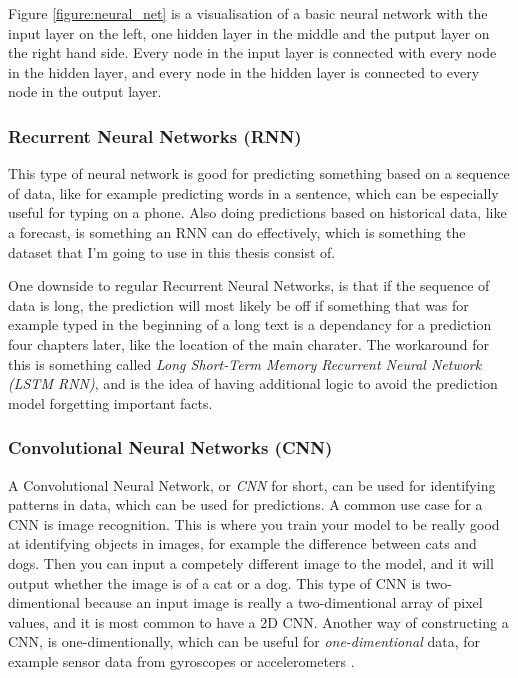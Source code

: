 Figure \ref{figure:neural_net} is a visualisation of a basic neural network with the input layer on the left,
one hidden layer in the middle and the putput layer on the right hand side. Every node in the input layer is connected with every node in the hidden layer,
and every node in the hidden layer is connected to every node in the output layer.

\subsubsection{Recurrent Neural Networks (RNN)}
This type of neural network is good for predicting something based on a sequence of data, like for example predicting words in a sentence, which 
can be especially useful for typing on a phone. Also doing predictions based on historical data, like a forecast, is something an RNN can do effectively, 
which is something the dataset that I'm going to use in this thesis consist of. 

One downside to regular Recurrent Neural Networks, is that if the sequence of data is long, the prediction will most likely be off if something that was for example 
typed in the beginning of a long text is a dependancy for a prediction four chapters later, like the location of the main charater. The workaround for this
is something called \textit{Long Short-Term Memory Recurrent Neural Network (LSTM RNN)}, and is the idea of having additional logic to avoid 
the prediction model forgetting important facts.

\subsubsection{Convolutional Neural Networks (CNN)}
A Convolutional Neural Network, or \textit{CNN} for short, can be used for identifying patterns in data, which can be used for predictions.
A common use case for a CNN is image recognition. This is where you train your model to be really good at identifying objects in images, 
for example the difference between cats and dogs. Then you can input a competely different image to the model, and it will output whether the image is of 
a cat or a dog. This type of CNN is two-dimentional because an input image is really a two-dimentional array of pixel values, and it is most common to have a 
2D CNN. Another way of constructing a CNN, is one-dimentionally, which can be useful for \textit{one-dimentional} data, for example sensor data from
gyroscopes or accelerometers \cite{1d_cnn}.

